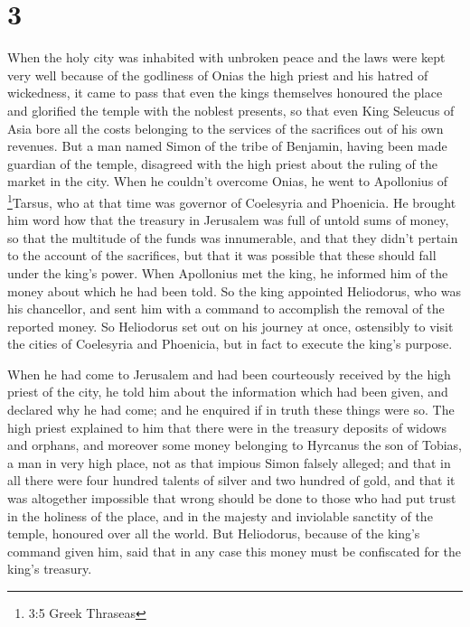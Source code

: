 \hypertarget{section-2}{%
\section{3}\label{section-2}}

 When the holy city was inhabited with unbroken peace and
the laws were kept very well because of the godliness of Onias the high
priest and his hatred of wickedness,  it came to pass that
even the kings themselves honoured the place and glorified the temple
with the noblest presents,  so that even King Seleucus of
Asia bore all the costs belonging to the services of the sacrifices out
of his own revenues.  But a man named Simon of the tribe of
Benjamin, having been made guardian of the temple, disagreed with the
high priest about the ruling of the market in the city. 
When he couldn't overcome Onias, he went to Apollonius of
\footnote{3:5 Greek Thraseas}Tarsus, who at that time was governor of
Coelesyria and Phoenicia.  He brought him word how that the
treasury in Jerusalem was full of untold sums of money, so that the
multitude of the funds was innumerable, and that they didn't pertain to
the account of the sacrifices, but that it was possible that these
should fall under the king's power.  When Apollonius met the
king, he informed him of the money about which he had been told. So the
king appointed Heliodorus, who was his chancellor, and sent him with a
command to accomplish the removal of the reported money.  So
Heliodorus set out on his journey at once, ostensibly to visit the
cities of Coelesyria and Phoenicia, but in fact to execute the king's
purpose.

 When he had come to Jerusalem and had been courteously
received by the high priest of the city, he told him about the
information which had been given, and declared why he had come; and he
enquired if in truth these things were so.  The high priest
explained to him that there were in the treasury deposits of widows and
orphans,  and moreover some money belonging to Hyrcanus the
son of Tobias, a man in very high place, not as that impious Simon
falsely alleged; and that in all there were four hundred talents of
silver and two hundred of gold,  and that it was altogether
impossible that wrong should be done to those who had put trust in the
holiness of the place, and in the majesty and inviolable sanctity of the
temple, honoured over all the world.  But Heliodorus,
because of the king's command given him, said that in any case this
money must be confiscated for the king's treasury.

